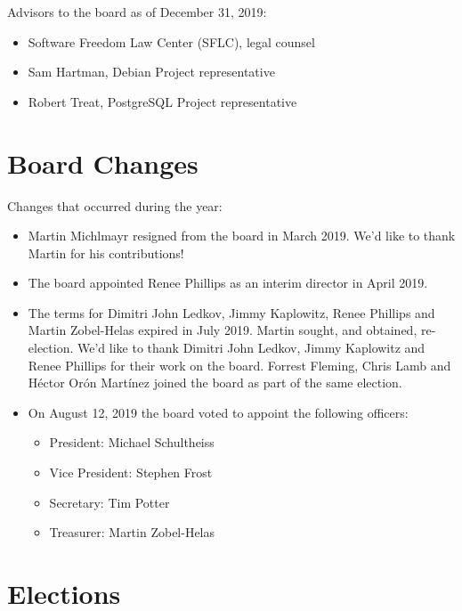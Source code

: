 \documentclass[a4paper]{report}
\begin{document}
Advisors to the board as of December 31, 2019:

\begin{itemize}
\item Software Freedom Law Center (SFLC), legal counsel
\item Sam Hartman, Debian Project representative
\item Robert Treat, PostgreSQL Project representative
\end{itemize}

\section{Board Changes}

Changes that occurred during the year:

\begin{itemize}

\item Martin Michlmayr resigned from the board in March 2019.
We'd like to thank Martin for his contributions!

\item The board appointed Renee Phillips as an interim director in
April 2019.

\item The terms for Dimitri John Ledkov, Jimmy Kaplowitz, Renee Phillips
and Martin Zobel-Helas expired in July 2019.  Martin sought, and
obtained, re-election.  We'd like to thank Dimitri John Ledkov, Jimmy
Kaplowitz and Renee Phillips for their work on the board.  Forrest
Fleming, Chris Lamb and Héctor Orón Martínez joined the board as part
of the same election.

\item On August 12, 2019 the board voted to appoint the following
officers:

\begin{itemize}
\item President: Michael Schultheiss
\item Vice President: Stephen Frost
\item Secretary: Tim Potter
\item Treasurer: Martin Zobel-Helas
\end{itemize}

\end{itemize}

\section{Elections}
\end{document}
